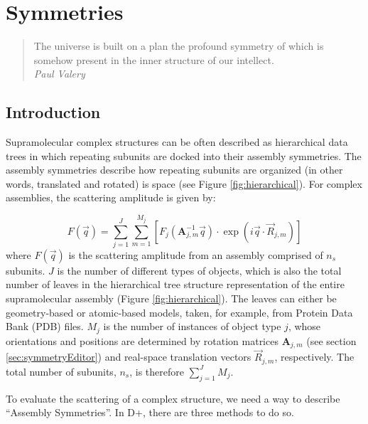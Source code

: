 \documentclass[../D+Manual.tex]{subfiles}
\begin{document}
\chapter{Symmetries} \label{chp:Symmetries}

\begin{quote}
	
	
	The universe is built on a plan the profound symmetry of which is somehow present in the inner structure of our intellect.\\
	\hspace*{\fill} \textit{Paul Valery}
\end{quote}

\section{Introduction}

Supramolecular complex structures can be often described as hierarchical data trees in which repeating subunits are docked into their assembly symmetries. The assembly symmetries describe how repeating subunits are organized (in other words, translated and rotated) is space (see Figure \ref{fig:hierarchical}). For complex assemblies, the scattering amplitude is given by: 

\begin{equation}
\label{eqn:assemblyScatteringAmplitude}
F\left(\vec{q}\right)=
\sum_{j=1}^{J}
\sum_{m=1}^{M_j}
\left[F_{j}\left(\mathbf{A}_{j,m}^{-1}\vec{q}\right)\cdot
\exp\left(i\vec{q}\cdot\vec{R}_{j,m}\right)\right]
\end{equation}
where $F\left(\vec{q}\right)$ is the scattering amplitude from an assembly comprised of $n_s$ subunits. $J$ is the number of different types of objects, which is also the total number of leaves in the hierarchical tree structure representation of the entire supramolecular assembly (Figure \ref{fig:hierarchical}). The leaves can either be geometry-based or atomic-based models, taken, for example, from Protein Data Bank (PDB) files. 
$M_j$ is the number of instances of object type $j$, whose orientations and positions are determined by rotation matrices  $\mathbf{A}_{j,m}$ (see section \ref{sec:symmetryEditor}) and real-space translation vectors $\vec{R}_{j,m}$, respectively. The total number of subunits, $n_s$, is therefore  $\sum_{j=1}^{J}{M_j}$.

To evaluate the scattering of a complex structure, we need a way to describe ``Assembly Symmetries''. In D+, there are three methods to do so.
\end{document}
